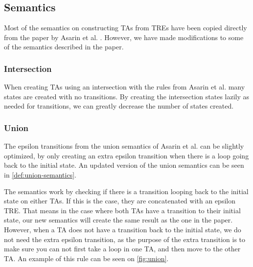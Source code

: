 \subsection{Semantics}\label{subsec:semantics}
\begin{comment}
Where do most of our semantics come from?

Intersection semantics
- Motivation

Describe union semantics
- Motivation
- New definition
- Visual change

Describe MatchAny semantics
- Motivation
- Definition
- Visual
\end{comment}

Most of the semantics on constructing TAs from TREs have been copied directly from the paper by Asarin et al. \cite{Eugene2001}. However, we have made modifications to some of the semantics described in the paper.

\subsubsection{Intersection}
When creating TAs using an intersection with the rules from Asarin et al.
many states are created with no transitions.
By creating the intersection states lazily as needed for transitions, we can greatly decrease the number of states created.

\subsubsection{Union}
The epsilon transitions from the union semantics of Asarin et al. can be slightly optimized, by only creating an extra epsilon transition when there is a loop going back to the initial state.
An updated version of the union semantics can be seen in \cref{def:union-semantics}.



The semantics work by checking if there is a transition looping back to the initial state on either TAs.
If this is the case, they are concatenated with an epsilon TRE.
That means in the case where both TAs have a transition to their initial state, our new semantics will create the same result as the one in the paper.
However, when a TA does not have a transition back to the initial state, we do not need the extra epsilon transition, as the purpose of the extra transition is to make sure you can not first take a loop in one TA, and then move to the other TA. An example of this rule can be seen on \cref{fig:union}.

